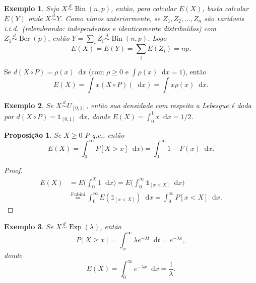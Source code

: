 \documentclass[reqno, final]{book}
\newcommand*\1{\mathds{1}}
\newtheorem{proposition}[theorem]{Proposição}
\newtheorem{example}{Exemplo}[section]
\DeclareMathOperator{\Ber}{Ber}
\DeclareMathOperator{\Bin}{Bin}
\DeclareMathOperator{\Exp}{Exp}
\def \iid{i.i.d.~}
\renewcommand*\d{\mathop{}\!\mathrm{d}}
\begin{document}
\begin{example}
  Seja $X \overset{d}\sim \Bin(n,p)$, então, para calcular $E(X)$, basta calcular $E(Y)$ onde $X \overset{d}\sim Y$.
  Como vimos anteriormente, se $Z_1, Z_2, \dots, Z_n$ são variáveis \iid (relembrando: independentes e identicamente distribuídos) com $Z_1 \overset{d}\sim \Ber(p)$, então $Y = \sum_i Z_i \overset{d}\sim \Bin(n,p)$.
  Logo
  \begin{equation}
    E(X) = E(Y) = \sum_i E(Z_i) = n p.
  \end{equation}
\end{example}

Se $d(X \circ P) = \rho(x) \d x$ (com $\rho \geq 0$ e $\int \rho(x) \d x = 1$), então
\begin{equation}
  E(X) = \int x (X \circ P)(\d x) = \int x \rho(x) \d x.
\end{equation}

\begin{example}
  Se $X \overset{d}\sim U_{[0,1]}$, então sua densidade com respeito a Lebesgue é dada por $d(X \circ P) = \1_{[0,1]} \d x$, donde $E(X) = \int_0^1 x \d x = 1/2$.
\end{example}

\begin{proposition}
  \label{p:espera_acumulada}
  Se $X \geq 0$ $P$-q.c., então
  \begin{equation}
    E(X) = \int_0^\infty P[X > x] \d x) = \int_0^\infty 1 - F(x) \d x.
  \end{equation}
\end{proposition}

\begin{proof}
  \begin{equation}
    \begin{split}
      E(X) & = E \Big( \int_0^X 1 \d x \Big) = E \Big( \int_0^\infty \1_{[x < X]} \d x \Big)\\
      & \overset{\text{Fubini}}= \int_0^\infty E(\1_{[x < X]}) \d x = \int_0^\infty P[x < X] \d x.
    \end{split}
  \end{equation}
\end{proof}

\begin{example}
  Se $X \overset{d}\sim \Exp(\lambda)$, então
  \begin{equation}
    P[X \geq x] = \int_x^\infty \lambda e^{-\lambda t} \d t = e^{-\lambda x},
  \end{equation}
  donde
  \begin{equation}
    E(X) = \int_0^\infty e^{-\lambda x} \d x = \frac{1}{\lambda}.
  \end{equation}
\end{example}
\end{document}

